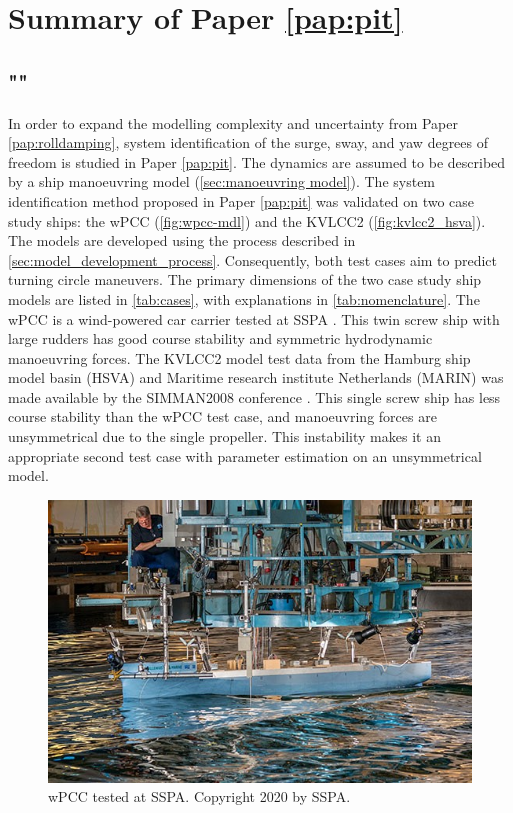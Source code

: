\section{Summary of Paper \ref{pap:pit}}
\subsection*{""}
In order to expand the modelling complexity and uncertainty from Paper \ref{pap:rolldamping}, system identification of the surge, sway, and yaw degrees of freedom is studied in Paper \ref{pap:pit}. The dynamics are assumed to be described by a ship manoeuvring model (\autoref{sec:manoeuvring model}). The system identification method proposed in Paper \ref{pap:pit} was validated on two case study ships: the wPCC (\autoref{fig:wpcc-mdl}) and the KVLCC2 (\autoref{fig:kvlcc2_hsva}). The models are developed using the process described in \autoref{sec:model_development_process}. Consequently, both test cases aim to predict turning circle maneuvers. The primary dimensions of the two case study ship models are listed in \autoref{tab:cases}, with explanations in \autoref{tab:nomenclature}. The wPCC is a wind-powered car carrier tested at SSPA \cite{alexandersson_wpcc_2022}. This twin screw ship with large rudders has good course stability and symmetric hydrodynamic manoeuvring forces. The KVLCC2 model test data from the Hamburg ship model basin (HSVA) and Maritime research institute Netherlands (MARIN) was made available by the SIMMAN2008 conference \cite{stern_experience_2011}. This single screw ship has less course stability than the wPCC test case, and manoeuvring forces are unsymmetrical due to the single propeller. This instability makes it an appropriate second test case with parameter estimation on an unsymmetrical model.

\begin{figure}[h!]
\centering
\includegraphics[width=0.7\linewidth]{kappa/images/wpcc_mdl.png}
\caption{wPCC tested at SSPA. Copyright 2020 by SSPA.}
\label{fig:wpcc-mdl}
\end{figure}

